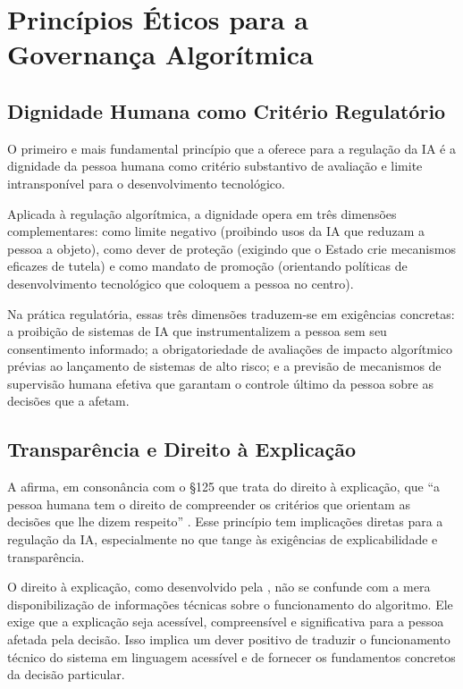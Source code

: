 \section{Princípios Éticos para a Governança Algorítmica}
\label{sec:principios-eticos-mh}

\subsection{Dignidade Humana como Critério Regulatório}
\label{subsec:dignidade-criterio}

O primeiro e mais fundamental princípio que a \MH{} oferece para a regulação da IA é a dignidade da pessoa humana como critério substantivo de avaliação e limite intransponível para o desenvolvimento tecnológico.

Aplicada à regulação algorítmica, a dignidade opera em três dimensões complementares: como limite negativo (proibindo usos da IA que reduzam a pessoa a objeto), como dever de proteção (exigindo que o Estado crie mecanismos eficazes de tutela) e como mandato de promoção (orientando políticas de desenvolvimento tecnológico que coloquem a pessoa no centro).

Na prática regulatória, essas três dimensões traduzem-se em exigências concretas: a proibição de sistemas de IA que instrumentalizem a pessoa sem seu consentimento informado; a obrigatoriedade de avaliações de impacto algorítmico prévias ao lançamento de sistemas de alto risco; e a previsão de mecanismos de supervisão humana efetiva que garantam o controle último da pessoa sobre as decisões que a afetam.

\subsection{Transparência e Direito à Explicação}
\label{subsec:transparencia-explicacao}

A \MH{} afirma, em consonância com o §125 que trata do direito à explicação, que ``a pessoa humana tem o direito de compreender os critérios que orientam as decisões que lhe dizem respeito'' \cite{LeaoXIV2026MH}. Esse princípio tem implicações diretas para a regulação da IA, especialmente no que tange às exigências de explicabilidade e transparência.

O direito à explicação, como desenvolvido pela \MH{}, não se confunde com a mera disponibilização de informações técnicas sobre o funcionamento do algoritmo. Ele exige que a explicação seja acessível, compreensível e significativa para a pessoa afetada pela decisão. Isso implica um dever positivo de traduzir o funcionamento técnico do sistema em linguagem acessível e de fornecer os fundamentos concretos da decisão particular.

